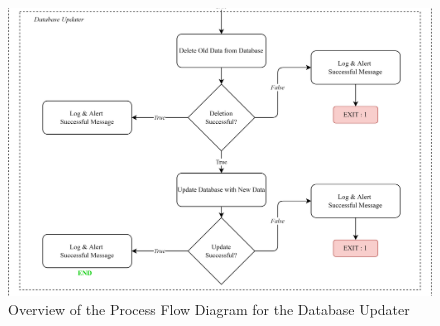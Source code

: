 \begin{figure}[ht]
    \centering
    \includegraphics[width=1\textwidth]{./assets/Chapter_3/PFC/ProcessFlowchart_DataProcessor3.png}
    \caption{Overview of the Process Flow Diagram for the Database Updater}
    \label{fig:process_flowchart_db_updater}
\end{figure}
\FloatBarrier